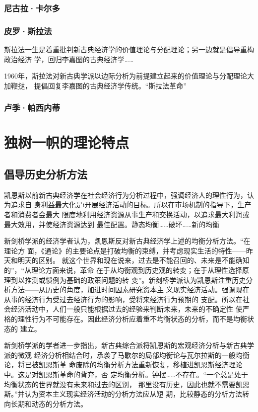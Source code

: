 \subsubsection{尼古拉·卡尔多}

\subsubsection{皮罗·斯拉法}

斯拉法一生是着重批判新古典经济学的价值理论与分配理论；另一边就是倡导重构政治经济
学，回归李嘉图的古典经济学……

1960年，斯拉法对新古典学派以边际分析为前提建立起来的价值理论与分配理论大加鞭挞，
提倡回复李嘉图的古典经济学传统。“斯拉法革命”

\subsubsection{卢季·帕西内蒂}

\section{独树一帜的理论特点}

\subsection{倡导历史分析方法}

凯恩斯以前新古典经济学在社会经济行为分析过程中，强调经济人的理性行为，认为追求自
身利益最大化是i开展经济活动的目标。所以在市场机制的指导下，生产者和消费者会最大
限度地利用经济资源从事生产和交换活动，以追求最大利润或最大效用，并使经济资源达到
最佳配置。静态均衡……破坏……新的均衡

新剑桥学派的经济学者认为，凯恩斯反对新古典经济学上述的均衡分析方法。“在理论方
面，《通论》的主要论点是打破均衡的束缚，并考虑现实生活的特性——昨天和明天的区别。
就这个世界和现在说来，过去是不能召回的、未来是不能确知的”，“从理论方面来说，革命
在于从均衡观到历史观的转变；在于从理性选择原理到以推测或惯例为基础的政策问题的转
变”。新剑桥学派认为凯恩斯注重历史分析方法——从历史的角度，加进时间因素研究资本主
义现实经济活动。强调现在从事的经济行为受过去经济行为的影响，受将来经济行为预期的
支配。所以在社会经济活动中，人们一般只能根据过去的经验来判断未来，未来的不确定性
使严格的理性行为不可能存在。因此经济分析应着重不均衡状态的分析，而不是均衡状态的
建立。

新剑桥学派的学者进一步指出，新古典综合派将凯恩斯的宏观经济分析与新古典学派的微观
经济分析相结合时，承袭了马歇尔的局部均衡论与瓦尔拉斯的一般均衡论，将已被凯恩斯革
命废除的均衡分析方法重新恢复，移植进凯恩斯经济理论中。这是对凯恩斯革命的背弃，否
定均衡分析。钟摆……不存在。“一个总是处于均衡状态的世界就没有未来和过去的区别，
那里没有历史，因此也就不需要凯恩斯。”并认为资本主义现实经济活动的分析方法应从短
期，比较静态的分析方法转向长期和动态的分析方法。

